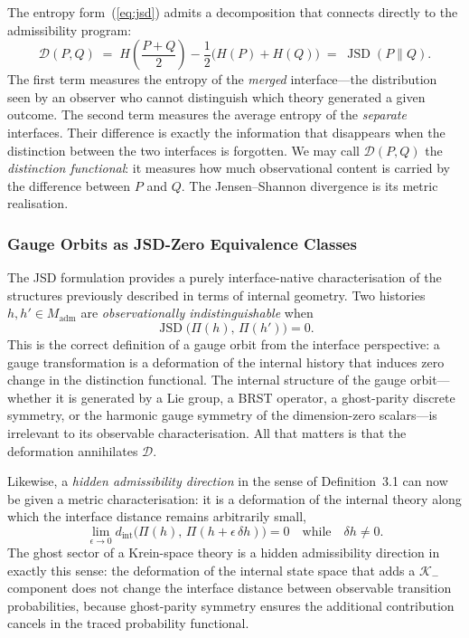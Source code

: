 \documentclass[12pt,a4paper]{article}
\theoremstyle{remark}
\begin{document}
The entropy form~(\ref{eq:jsd}) admits a decomposition that connects
directly to the admissibility program:
\begin{equation}
  \mathcal{D}(P, Q)
  \;=\;
  H\!\left(\frac{P+Q}{2}\right)
  - \frac{1}{2}\bigl(H(P) + H(Q)\bigr)
  \;=\;
  \operatorname{JSD}(P\|Q).
\end{equation}
The first term measures the entropy of the \emph{merged} interface---the
distribution seen by an observer who cannot distinguish which theory
generated a given outcome. The second term measures the average entropy of
the \emph{separate} interfaces. Their difference is exactly the information
that disappears when the distinction between the two interfaces is forgotten.
We may call $\mathcal{D}(P,Q)$ the \emph{distinction functional}: it
measures how much observational content is carried by the difference between
$P$ and $Q$. The Jensen--Shannon divergence is its metric realisation.

\subsubsection*{Gauge Orbits as JSD-Zero Equivalence Classes}

The JSD formulation provides a purely interface-native characterisation of
the structures previously described in terms of internal geometry. Two
histories $h, h' \in M_{\mathrm{adm}}$ are \emph{observationally
indistinguishable} when
\begin{equation}
  \operatorname{JSD}\bigl(\Pi(h),\, \Pi(h')\bigr) = 0.
\end{equation}
This is the correct definition of a gauge orbit from the interface
perspective: a gauge transformation is a deformation of the internal
history that induces zero change in the distinction functional. The
internal structure of the gauge orbit---whether it is generated by a Lie
group, a BRST operator, a ghost-parity discrete symmetry, or the harmonic
gauge symmetry of the dimension-zero scalars---is irrelevant to its
observable characterisation. All that matters is that the deformation
annihilates $\mathcal{D}$.

Likewise, a \emph{hidden admissibility direction} in the sense of
Definition~3.1 can now be given a metric characterisation: it is a
deformation of the internal theory along which the interface distance
remains arbitrarily small,
\begin{equation}
  \lim_{\epsilon \to 0}
  d_{\mathrm{int}}\!\bigl(\Pi(h),\, \Pi(h + \epsilon\, \delta h)\bigr)
  = 0
  \quad \text{while} \quad \delta h \neq 0.
\end{equation}
The ghost sector of a Krein-space theory is a hidden admissibility direction
in exactly this sense: the deformation of the internal state space that
adds a $\mathcal{K}_-$ component does not change the interface distance
between observable transition probabilities, because ghost-parity symmetry
ensures the additional contribution cancels in the traced probability
functional.
\end{document}
